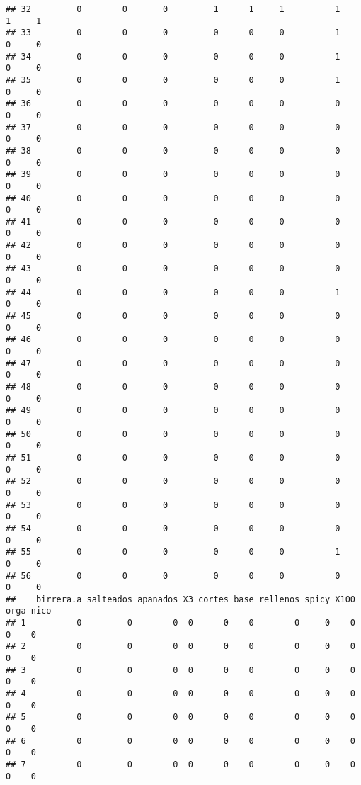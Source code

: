 \documentclass[
]{article}
\begin{document}
\begin{verbatim}
## 32         0        0       0         1      1     1          1     1     1
## 33         0        0       0         0      0     0          1     0     0
## 34         0        0       0         0      0     0          1     0     0
## 35         0        0       0         0      0     0          1     0     0
## 36         0        0       0         0      0     0          0     0     0
## 37         0        0       0         0      0     0          0     0     0
## 38         0        0       0         0      0     0          0     0     0
## 39         0        0       0         0      0     0          0     0     0
## 40         0        0       0         0      0     0          0     0     0
## 41         0        0       0         0      0     0          0     0     0
## 42         0        0       0         0      0     0          0     0     0
## 43         0        0       0         0      0     0          0     0     0
## 44         0        0       0         0      0     0          1     0     0
## 45         0        0       0         0      0     0          0     0     0
## 46         0        0       0         0      0     0          0     0     0
## 47         0        0       0         0      0     0          0     0     0
## 48         0        0       0         0      0     0          0     0     0
## 49         0        0       0         0      0     0          0     0     0
## 50         0        0       0         0      0     0          0     0     0
## 51         0        0       0         0      0     0          0     0     0
## 52         0        0       0         0      0     0          0     0     0
## 53         0        0       0         0      0     0          0     0     0
## 54         0        0       0         0      0     0          0     0     0
## 55         0        0       0         0      0     0          1     0     0
## 56         0        0       0         0      0     0          0     0     0
##    birrera.a salteados apanados X3 cortes base rellenos spicy X100 orga nico
## 1          0         0        0  0      0    0        0     0    0    0    0
## 2          0         0        0  0      0    0        0     0    0    0    0
## 3          0         0        0  0      0    0        0     0    0    0    0
## 4          0         0        0  0      0    0        0     0    0    0    0
## 5          0         0        0  0      0    0        0     0    0    0    0
## 6          0         0        0  0      0    0        0     0    0    0    0
## 7          0         0        0  0      0    0        0     0    0    0    0

\end{verbatim}
\end{document}
